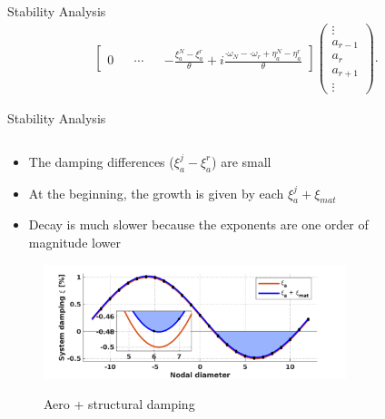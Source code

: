 \documentclass[dvipsnames, aspectratio = 169]{beamer}
\begin{document}
\begin{frame}{Stability Analysis}
\begin{equation}
\begin{split}
\begin{bmatrix}
				0                                                                                             &        & \cdots &        & -\frac{\xi_a^N - \xi_a^r}{\theta} + i\frac{·\omega_N - ·\omega_r + \eta_a^N-\eta_a^r}{\theta}
			\end{bmatrix}\begin{pmatrix}
				\vdots  \\
				a_{r-1} \\
				a_r     \\
				a_{r+1} \\
				\vdots
			\end{pmatrix}.
		\end{split}
	\end{equation}
\end{frame}

\begin{frame}{Stability Analysis}
	\begin{columns}
		\begin{column}{0.5\textwidth}
			\begin{itemize}
				\item The damping differences ($\xi_a^j-\xi_a^r $) are small
				\item At the beginning, the growth is given by each $ \xi_a^j + \xi_{mat} $
				\item Decay is much slower because the exponents are one order of magnitude lower
			\end{itemize}
			\begin{figure}[h!]
				\centering
				\includegraphics[width = 0.9\textwidth]{aerodynamic_damp_stability.png}
				\label{fig:omega_distributiona22}
				\caption{Aero + structural damping}
			\end{figure}
		\end{column}
		\begin{column}{0.5\textwidth}
			\begin{figure}[h]
				\centering

\end{figure}
\end{column}
\end{columns}
\end{frame}
\end{document}
